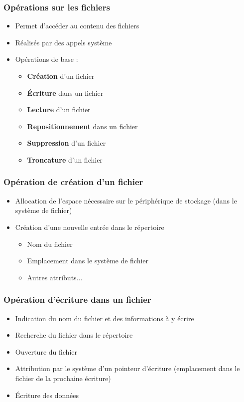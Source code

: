 \begin{frame}
\frametitle{Opérations sur les fichiers}
\begin{itemize}
\item Permet d'accéder au contenu des fichiers
\item Réalisés par des appels système
\item Opérations de base :
\begin{itemize}
\item \textbf{Création} d'un fichier
\item \textbf{Écriture} dans un fichier
\item \textbf{Lecture} d'un fichier
\item \textbf{Repositionnement} dans un fichier
\item \textbf{Suppression} d'un fichier
\item \textbf{Troncature} d'un fichier
\end{itemize}
\end{itemize}
\end{frame}


\begin{frame}
\frametitle{Opération de création d'un fichier}
\begin{itemize}
\item Allocation de l'espace nécessaire sur le périphérique de stockage (dans le système de fichier)
\item Création d'une nouvelle entrée dans le répertoire
\begin{itemize}
\item Nom du fichier
\item Emplacement dans le système de fichier
\item Autres attributs...
\end{itemize}
\end{itemize}
\end{frame}


\begin{frame}
\frametitle{Opération d'écriture dans un fichier }
\begin{itemize}
\item Indication du nom du fichier et des informations à y écrire
\item Recherche du fichier dans le répertoire
\item Ouverture du fichier 
\item Attribution par le système d'un pointeur d'écriture (emplacement dans le fichier de la prochaine écriture)
\item Écriture des données
\end{itemize}
\end{frame}

